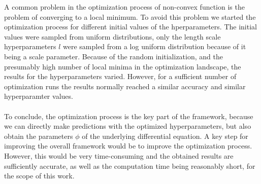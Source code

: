 \documentclass{article}
\begin{document}
A common problem in the optimization process of non-convex function is the problem of converging to a local minimum. To avoid this problem we started the optimization process for different initial values of the hperparameters. The initial values were sampled from uniform distributions, only the length scale hyperparameters $l$ were sampled from a log uniform distribution because of it being a scale parameter. Because of the random initialization, and the presumably high number of local minima in the optimization landscape, the results for the hyperparameters varied. However, for a sufficient number of optimization runs the results normally reached a similar accuracy and similar hyperparamter values.\\
\\
To conclude, the optimization process is the key part of the framework, because we can directly make predictions with the optimized hyperparameters, but also obtain the parameters $\phi$ of the underlying differential equation. A key step for improving the overall framework would be to improve the optimization process. However, this would be very time-consuming and the obtained results are sufficiently accurate, as well as the computation time being reasonably short, for the scope of this work.\\
\end{document}

